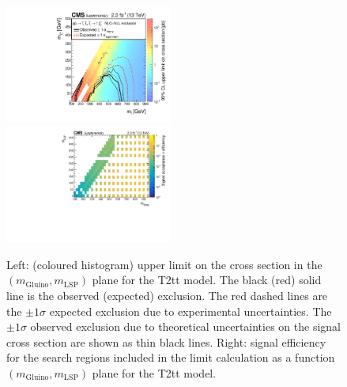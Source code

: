 \begin{figure}[t]
  \begin{center}
    \includegraphics[width=0.49\textwidth]{GenMetXSEC_aux} \, %
    \includegraphics[width=0.49\textwidth]{T2tt_merging_4_cats_aux} \,     
  \end{center}
  \caption{Left: (coloured histogram) upper limit on the cross section in the $(m_{\mathrm{Gluino}},m_{\mathrm{LSP}})$ plane for the T2tt model. 
  The black (red) solid line is the observed (expected) exclusion. The red dashed lines are the $\pm1\sigma$ expected exclusion due to experimental uncertainties. 
  The $\pm1\sigma$ observed exclusion due to theoretical uncertainties on the signal cross section are shown as thin black lines. 
  Right: signal efficiency for the search regions included in the limit calculation as a function $(m_{\mathrm{Gluino}},m_{\mathrm{LSP}})$ plane for the T2tt model. 
  \label{fig:T2tt_excl}}
\end{figure}


